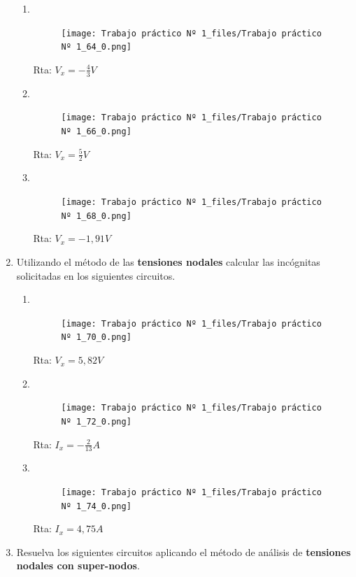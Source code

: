 \documentclass[10pt,a4paper]{article}
\begin{document}
\begin{enumerate}
\begin{enumerate}
	\item \
	
	\begin{figure}[H]
		\centering
		\texttt{[image: Trabajo práctico Nº 1\_files/Trabajo práctico Nº 1\_64\_0.png]}
		\label{e14a}
	\end{figure}
	Rta: $V_x=-\frac{4}{3}V$
	\item \

	\begin{figure}[H]
		\centering
		\texttt{[image: Trabajo práctico Nº 1\_files/Trabajo práctico Nº 1\_66\_0.png]}
		\label{e14b}
	\end{figure}
	Rta: $V_x=\frac{5}{2}V$
	
		\item \
	
	\begin{figure}[H]
		\centering
		\texttt{[image: Trabajo práctico Nº 1\_files/Trabajo práctico Nº 1\_68\_0.png]}
		\label{e14c}
	\end{figure}
	
	Rta: $V_x=-1,91V$
	
\end{enumerate}




\item Utilizando el método de las \textbf{tensiones nodales} calcular las incógnitas solicitadas en los siguientes circuitos.

\begin{enumerate}
	\item \
	
	\begin{figure}[H]
		\centering
		\texttt{[image: Trabajo práctico Nº 1\_files/Trabajo práctico Nº 1\_70\_0.png]}
		\label{e15a}
	\end{figure}
	Rta: $V_x=5,82V$
	
	\item \
	
	\begin{figure}[H]
		\centering
		\texttt{[image: Trabajo práctico Nº 1\_files/Trabajo práctico Nº 1\_72\_0.png]}
		\label{e15b}
	\end{figure}
	Rta: $I_x=-\frac{2}{13}A$
	
	\item \
	
	\begin{figure}[H]
		\centering
		\texttt{[image: Trabajo práctico Nº 1\_files/Trabajo práctico Nº 1\_74\_0.png]}
		\label{e15c}
	\end{figure}
	Rta: $I_x=4,75A$
\end{enumerate}
\item Resuelva los siguientes circuitos aplicando el método de análisis de \textbf{tensiones nodales con super-nodos}.


\end{enumerate}
\end{document}
